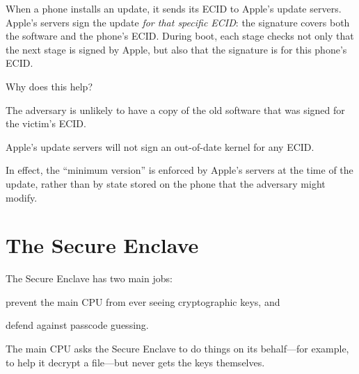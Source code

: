 When a phone installs an update, it sends its ECID to Apple's update
servers.
Apple's servers sign the update \emph{for that specific ECID}:
the signature covers both the software and the phone's ECID.
During boot, each stage checks not only that the next stage is signed by
Apple, but also that the signature is for this phone's ECID.

Why does this help?
\begin{compactitem}
  \item The adversary is unlikely to have a copy of the old software that
        was signed for the victim's ECID.
  \item Apple's update servers will not sign an out-of-date kernel for any
        ECID.
\end{compactitem}
In effect, the ``minimum version'' is enforced by Apple's servers at the
time of the update, rather than by state stored on the phone that the
adversary might modify.

\section{The Secure Enclave}
\label{sec:ios:enclave}

The Secure Enclave has two main jobs:
\begin{compactitem}
  \item prevent the main CPU from ever seeing cryptographic keys, and
  \item defend against passcode guessing.
\end{compactitem}
The main CPU asks the Secure Enclave to do things on its behalf---for
example, to help it decrypt a file---but never gets the keys themselves.

